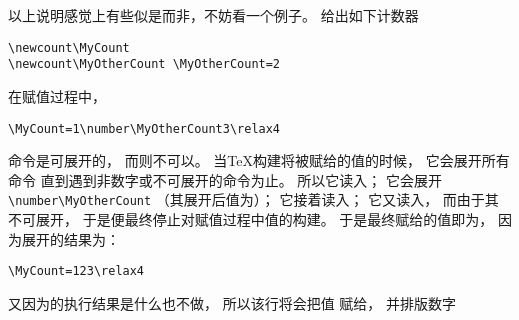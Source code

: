 \documentclass{book}
\begin{document}
以上说明感觉上有些似是而非，不妨看一个例子。
给出如下计数器
\begin{verbatim}
\newcount\MyCount
\newcount\MyOtherCount \MyOtherCount=2
\end{verbatim}
在赋值过程中，
\begin{verbatim}
\MyCount=1\number\MyOtherCount3\relax4
\end{verbatim}
命令是可展开的，
而则不可以。
当{\TeX}构建将被赋给的值的时候，
它会展开所有命令
直到遇到非数字或不可展开的命令为止。
所以它读入；
它会展开\verb>\number\MyOtherCount>
（其展开后值为）；
它接着读入；
它又读入，
而由于其不可展开，
于是便最终停止对赋值过程中值的构建。
于是最终赋给的值即为，
因为展开的结果为：
\begin{verbatim}
\MyCount=123\relax4
\end{verbatim}
又因为的执行结果是什么也不做，
所以该行将会把值
赋给，
并排版数字
\end{document}

